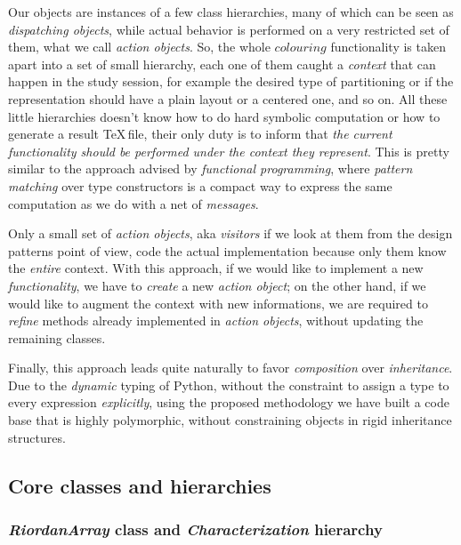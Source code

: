 Our objects are instances of a few class hierarchies, many of which can be seen
as \emph{dispatching objects}, while actual behavior is performed on a very
restricted set of them, what we call \emph{action objects}. So, the whole
$colouring$ functionality is taken apart into a set of small hierarchy, each
one of them caught a \emph{context} that can happen in the study session, for
example the desired type of partitioning or if the representation should have a
plain layout or a centered one, and so on. All these little hierarchies doesn't
know how to do hard symbolic computation or how to generate a result
\TeX\,file, their only duty is to inform that \emph{the current functionality
should be performed under the context they represent}. This is pretty similar
to the approach advised by \emph{functional programming}, where \emph{pattern
matching} over type constructors is a compact way to express the same
computation as we do with a net of \emph{messages}.

Only a small set of \emph{action objects}, aka \emph{visitors} if we look at
them from the design patterns point of view, code the actual implementation
because only them know the \emph{entire} context. With this approach, if we
would like to implement a new \emph{functionality}, we have to \emph{create} a
new \emph{action object}; on the other hand, if we would like to augment the
context with new informations, we are required to \emph{refine} methods already
implemented in \emph{action objects}, without updating the remaining classes.

Finally, this approach leads quite naturally to favor \emph{composition} over
\emph{inheritance}. Due to the \emph{dynamic} typing of Python, without the
constraint to assign a type to every expression \emph{explicitly}, using the
proposed methodology we have built a code base that is highly polymorphic,
without constraining objects in rigid inheritance structures.

\subsection{Core classes and hierarchies}

\subsubsection{\emph{RiordanArray} class and \emph{Characterization} hierarchy}

